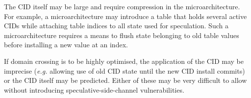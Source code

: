 The CID itself may be large and require compression in the microarchitecture.
For example, a microarchitecture may introduce a table that holds several active CIDs while attaching table indices to all state used for speculation.
Such a microarchitecture requires a means to flush state belonging to old table values before installing a new value at an index.

If domain crossing is to be highly optimised, the application of the CID may be imprecise (\textit{e.g.} allowing use of old CID state until the new CID install commits) or the CID itself may be predicted.
Either of these may be very difficult to allow without introducing speculative-side-channel vulnerabilities.
